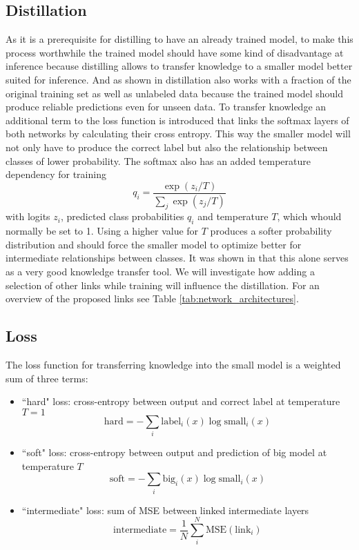 \documentclass[10pt,twocolumn,letterpaper]{article}
\begin{document}
\subsection{Distillation}
As it is a prerequisite for distilling to have an already trained model, to make this process worthwhile the trained model should have some kind of disadvantage at inference because distilling allows to transfer knowledge to a smaller model better suited for inference. And as shown in \cite{hinton2015distilling} distillation also works with a fraction of the original training set as well as unlabeled data because the trained model should produce reliable predictions even for unseen data.
To transfer knowledge an additional term to the loss function is introduced that links the softmax layers of both networks by calculating their cross entropy. This way the smaller model will not only have to produce the correct label but also the relationship between classes of lower probability. The softmax also has an added temperature dependency for training
\begin{equation}
	q_i = \frac{\exp(z_i / T)}{\sum_j \exp(z_j/T)}
	\label{eq:softmaxtemperature}
\end{equation}
with logits $z_i$, predicted class probabilities $q_i$ and temperature $T$, which whould normally be set to 1. Using a higher value for $T$ produces a softer probability distribution and should force the smaller model to optimize better for intermediate relationships between classes. It was shown in \cite{hinton2015distilling} that this alone serves as a very good knowledge transfer tool. We will investigate how adding a selection of other links while training will influence the distillation. For an overview of the proposed links see Table \ref{tab:network_architectures}.

\subsection{Loss}
The loss function for transferring knowledge into the small model is a weighted sum of three terms:

\begin{itemize}
	\item ``hard" loss: cross-entropy between output and correct label at temperature $T=1$
		\begin{equation}
			\text{hard} = -\sum_i \text{label}_i(x) \log \text{small}_i(x)
			\label{eq:hardloss}
		\end{equation}
	\item ``soft" loss: cross-entropy between output and prediction of big model at temperature $T$
		\begin{equation}
			\text{soft} = -\sum_i \text{big}_i(x) \log \text{small}_i(x)
			\label{eq:softloss}
		\end{equation}
	\item ``intermediate" loss: sum of MSE between linked intermediate layers
		\begin{equation}
			\text{intermediate} = \frac{1}{N} \sum_i^N \text{MSE}(\text{link}_i)
			\label{eq:intermediateloss}
		\end{equation}
\end{itemize}
\end{document}
